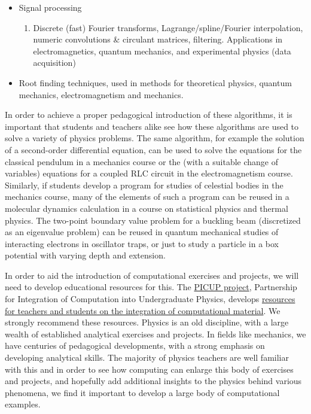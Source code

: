 \begin{itemize}
\begin{enumerate}
\end{enumerate}

\noindent
\item Signal processing
\begin{enumerate}

  \item Discrete (fast) Fourier transforms, Lagrange/spline/Fourier interpolation, numeric convolutions {\&} circulant matrices, filtering. Applications in electromagnetics, quantum mechanics, and experimental physics (data acquisition)

\end{enumerate}

\noindent
\item Root finding techniques, used in methods for theoretical physics, quantum mechanics, electromagnetism and mechanics.
\end{itemize}

\noindent
In order to achieve a proper pedagogical introduction of these algorithms, it is important that students and teachers alike see how these algorithms are used to solve a variety of physics problems. The same algorithm, for example the solution of a second-order differential equation, can be used to solve the equations for the classical pendulum in a mechanics course or the (with a suitable change of variables) equations for a coupled RLC circuit in the electromagnetism course. Similarly, if students develop a program for studies of celestial bodies in the mechanics course, many of the elements of such a program can be reused in a molecular dynamics calculation in a course on statistical physics and thermal physics. The two-point boundary value problem for a buckling beam
(discretized as an eigenvalue problem) can be reused in quantum mechanical studies of interacting electrons in oscillator traps, or just to study a particle in a box potential with varying depth and extension.

In order to aid the introduction of computational exercises and projects, we will need to develop educational resources for this. The \href{{http://www.compadre.org/picup/}}{PICUP project},  Partnership for Integration of Computation into Undergraduate Physics, develops \href{{http://www.compadre.org/PICUP/resources/}}{resources for teachers and students on the integration of computational  material}.   We strongly recommend these resources.  Physics is an old discipline, with a large wealth of established analytical exercises and projects. In fields like mechanics, we have centuries of pedagogical developments, with a strong emphasis on developing analytical skills. The majority of physics teachers are well familiar with this and in order to see how computing can enlarge this body of exercises and projects, and hopefully add additional insights to the physics behind various phenomena, we find it important to develop a large body of computational examples.

